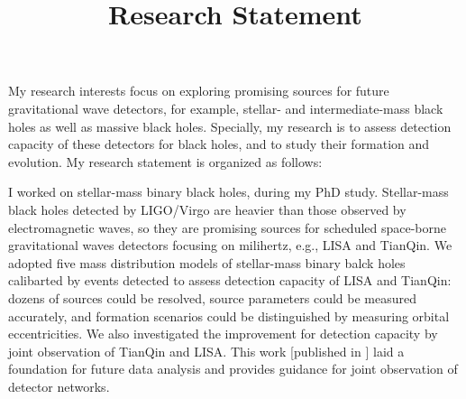 \documentclass[12pt,a4paper,sans]{article}%
\title{\vspace{-2.5cm}\Huge Research Statement \vspace{-2.2em}}
\date{}
\begin{document}
\maketitle

My research interests focus on exploring promising sources for future gravitational wave detectors, for example, stellar- and
intermediate-mass black holes as well as massive black holes. Specially, my research is to assess detection capacity of
these detectors for black holes, and to study their formation and evolution. My research statement is organized as
follows:  

I worked on stellar-mass binary black holes, during my PhD study. Stellar-mass black holes detected by
LIGO/Virgo are heavier than those observed by electromagnetic waves, so they are promising sources for scheduled
space-borne gravitational waves detectors focusing on milihertz, e.g., LISA and TianQin. We adopted five mass
distribution models of stellar-mass binary balck holes calibarted by events detected to assess detection capacity of
LISA and TianQin: dozens of sources could be resolved, source parameters could be measured accurately, and formation
scenarios could be distinguished by measuring orbital eccentricities. We also investigated the improvement for detection capacity by joint
observation of TianQin and LISA. This work [published in ] laid a foundation for future data analysis and provides
guidance for joint observation of detector networks. 
\end{document}
